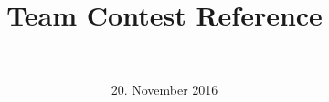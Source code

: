 \documentclass{article}
\title{Team Contest Reference}
\author{\teamname \\ \university}
\date{20. November 2016}
\begin{document}
\maketitle
\setlength{\columnsep}{1cm}
\begin{multicols}{2}
	\tableofcontents
\end{multicols}
\newpage

\begin{multicols*}{2}
  
  
  
  
  
  
  
\end{multicols*}
\end{document}

